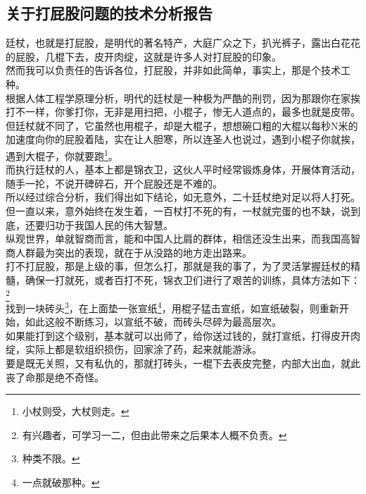 \begin{multicols}{\theparacolNo}
\subsection{关于打屁股问题的技术分析报告}
廷杖，也就是打屁股，是明代的著名特产，大庭广众之下，扒光裤子，露出白花花的屁股，几棍下去，皮开肉绽，这就是许多人对打屁股的印象。\\

然而我可以负责任的告诉各位，打屁股，并非如此简单，事实上，那是个技术工种。\\

根据人体工程学原理分析，明代的廷杖是一种极为严酷的刑罚，因为那跟你在家挨打不一样，你爹打你，无非是用扫把，小棍子，惨无人道点的，最多也就是皮带。\\

但廷杖就不同了，它虽然也用棍子，却是大棍子，想想碗口粗的大棍以每秒N米的加速度向你的屁股着陆，实在让人胆寒，所以连圣人也说过，遇到小棍子你就挨，遇到大棍子，你就要跑\footnote{小杖则受，大杖则走。}。\\

而执行廷杖的人，基本上都是锦衣卫，这伙人平时经常锻炼身体，开展体育活动，随手一抡，不说开碑碎石，开个屁股还是不难的。\\

所以经过综合分析，我们得出如下结论，如无意外，二十廷杖绝对足以将人打死。\\

但一直以来，意外始终在发生着，一百杖打不死的有，一杖就完蛋的也不缺，说到底，还要归功于我国人民的伟大智慧。\\

纵观世界，单就智商而言，能和中国人比肩的群体，相信还没生出来，而我国高智商人群最为突出的表现，就在于从没路的地方走出路来。\\

打不打屁股，那是上级的事，但怎么打，那就是我的事了，为了灵活掌握廷杖的精髓，确保一打就死，或者百打不死，锦衣卫们进行了艰苦的训练，具体方法如下：\footnote{有兴趣者，可学习一二，但由此带来之后果本人概不负责。}\\

找到一块砖头\footnote{种类不限。}，在上面垫一张宣纸\footnote{一点就破那种。}，用棍子猛击宣纸，如宣纸破裂，则重新开始，如此这般不断练习，以宣纸不破，而砖头尽碎为最高层次。\\

如果能打到这个级别，基本就可以出师了，给你送过钱的，就打宣纸，打得皮开肉绽，实际上都是软组织损伤，回家涂了药，起来就能游泳。\\

要是既无关照，又有私仇的，那就打砖头，一棍下去表皮完整，内部大出血，就此丧了命那是绝不奇怪。\\


\end{multicols}

